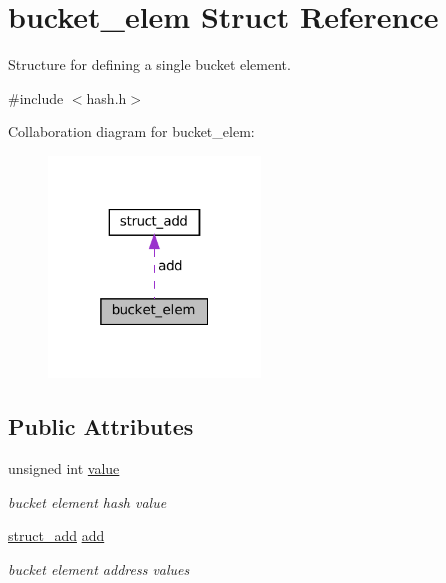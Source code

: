 \hypertarget{structbucket__elem}{}\section{bucket\+\_\+elem Struct Reference}
\label{structbucket__elem}


Structure for defining a single bucket element.  




{\ttfamily \#include $<$hash.\+h$>$}



Collaboration diagram for bucket\+\_\+elem\+:\nopagebreak
\begin{figure}[H]
\begin{center}
\leavevmode
\includegraphics[width=160pt]{structbucket__elem__coll__graph}
\end{center}
\end{figure}
\subsection*{Public Attributes}
\begin{DoxyCompactItemize}
\item 
\mbox{\label{structbucket__elem_acba8382505705bf798600c054f71310d}} 
unsigned int \hyperlink{structbucket__elem_acba8382505705bf798600c054f71310d}{value}
\begin{DoxyCompactList}\small\item\em bucket element hash value \end{DoxyCompactList}\item 
\mbox{\label{structbucket__elem_a07ad9eddc7a5bd1ebff68bbee97f075d}} 
\hyperlink{structstruct__add}{struct\+\_\+add} \hyperlink{structbucket__elem_a07ad9eddc7a5bd1ebff68bbee97f075d}{add}
\begin{DoxyCompactList}\small\item\em bucket element address values \end{DoxyCompactList}\end{DoxyCompactItemize}


